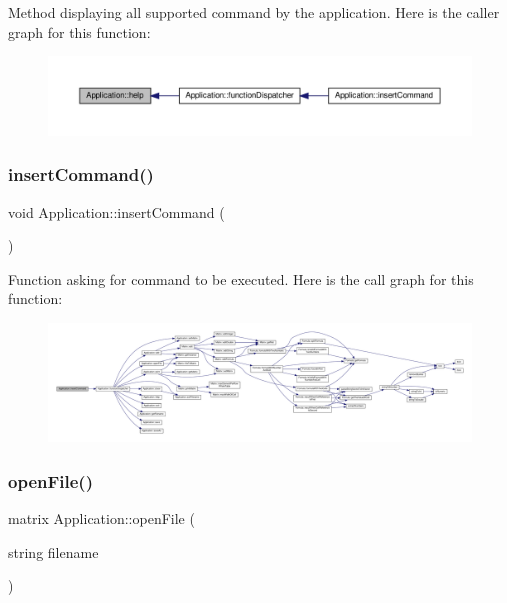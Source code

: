 Method displaying all supported command by the application. Here is the caller graph for this function\+:
\nopagebreak
\begin{figure}[H]
\begin{center}
\leavevmode
\includegraphics[width=350pt]{class_application_a2c6518d7f121299d9be8c66d31997fbc_icgraph}
\end{center}
\end{figure}
\mbox{\label{class_application_a474d8507e340581404d4044c0228f655}} 
\subsubsection{\texorpdfstring{insert\+Command()}{insertCommand()}}
{\footnotesize\ttfamily void Application\+::insert\+Command (\begin{DoxyParamCaption}{ }\end{DoxyParamCaption})}

Function asking for command to be executed. Here is the call graph for this function\+:
\nopagebreak
\begin{figure}[H]
\begin{center}
\leavevmode
\includegraphics[width=350pt]{class_application_a474d8507e340581404d4044c0228f655_cgraph}
\end{center}
\end{figure}
\mbox{\label{class_application_ab2f161414a4e2f16e28321c192051006}} 
\subsubsection{\texorpdfstring{open\+File()}{openFile()}}
{\footnotesize\ttfamily matrix Application\+::open\+File (\begin{DoxyParamCaption}\item[{string}]{filename }\end{DoxyParamCaption})\hspace{0.3cm}{\ttfamily [private]}}

